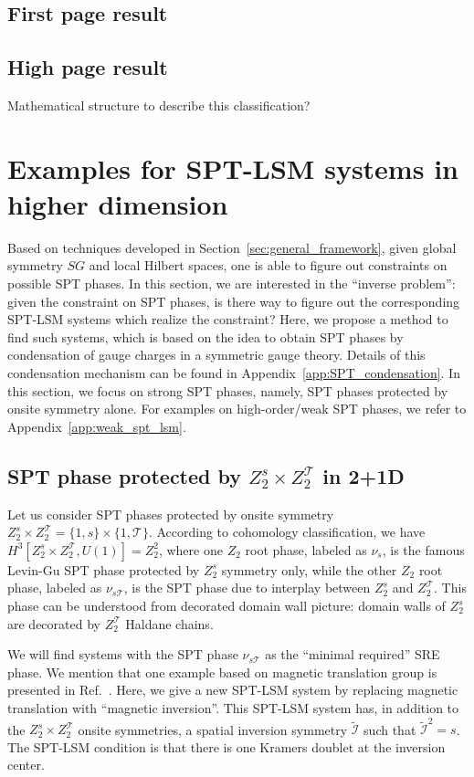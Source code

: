 \documentclass[reprint,amsmath,amssymb,aps,pra,]{revtex4-1}
\newcommand{\TT}{\mathcal{T}} %
\newcommand{\II}{\mathcal{I}} %
\begin{document}
\subsection{First page result}

\subsection{High page result}

{\color{red} Mathematical structure to describe this classification?}


\section{Examples for SPT-LSM systems in higher dimension}\label{sec:higher_dim_spt_lsm}
Based on techniques developed in Section~\ref{sec:general_framework}, given global symmetry $SG$ and local Hilbert spaces, one is able to figure out constraints on possible SPT phases.
In this section, we are interested in the ``inverse problem'': 
given the constraint on SPT phases, is there way to figure out the corresponding SPT-LSM systems which realize the constraint?
Here, we propose a method to find such systems, which is based on the idea to obtain SPT phases by condensation of gauge charges in a symmetric gauge theory.
Details of this condensation mechanism can be found in Appendix~\ref{app:SPT_condensation}.
In this section, we focus on strong SPT phases, namely, SPT phases protected by onsite symmetry alone.
For examples on high-order/weak SPT phases, we refer to Appendix~\ref{app:weak_spt_lsm}.

\subsection{SPT phase protected by $Z_2^s\times Z_2^\TT$ in 2+1D}\label{subsec:z2hT_spt_2+1}
Let us consider SPT phases protected by onsite symmetry $Z_2^s\times Z_2^\TT=\{1,s\}\times\{1,\TT\}$.
According to cohomology classification, we have $H^3[Z_2^s\times Z_2^\TT,U(1)]=Z_2^2$, where one $Z_2$ root phase, labeled as $\nu_s$, is the famous Levin-Gu SPT phase protected by $Z_2^s$ symmetry only\cite{LevinGu2012}, while the other $Z_2$ root phase, labeled as $\nu_{s\TT}$, is the SPT phase due to interplay between $Z_2^s$ and $Z_2^\TT$. 
This phase can be understood from decorated domain wall picture: domain walls of $Z_2^s$ are decorated by $Z_2^\TT$ Haldane chains\cite{ChenLuVishwanath2014}.

We will find systems with the SPT phase $\nu_{s\TT}$ as the ``minimal required'' SRE phase. 
We mention that one example based on magnetic translation group is presented in Ref.~.
Here, we give a new SPT-LSM system by replacing magnetic translation with ``magnetic inversion''.
This SPT-LSM system has, in addition to the $Z_2^s\times Z_2^\TT$ onsite symmetries, a spatial inversion symmetry $\widetilde{\II}$ such that $\widetilde{\II}^2=s$. The SPT-LSM condition is that there is one Kramers doublet at the inversion center.
\end{document}
